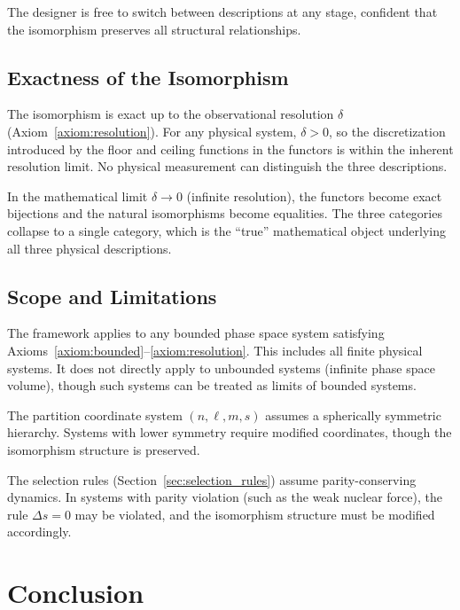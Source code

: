 \documentclass[twocolumn,10pt]{article}
\theoremstyle{remark}
\begin{document}
The designer is free to switch between descriptions at any stage, confident that the isomorphism preserves all structural relationships.

\subsection{Exactness of the Isomorphism}

The isomorphism is exact up to the observational resolution $\delta$ (Axiom~\ref{axiom:resolution}).
For any physical system, $\delta > 0$, so the discretization introduced by the floor and ceiling functions in the functors is within the inherent resolution limit.
No physical measurement can distinguish the three descriptions.

In the mathematical limit $\delta \to 0$ (infinite resolution), the functors become exact bijections and the natural isomorphisms become equalities.
The three categories collapse to a single category, which is the ``true'' mathematical object underlying all three physical descriptions.

\subsection{Scope and Limitations}

The framework applies to any bounded phase space system satisfying Axioms~\ref{axiom:bounded}--\ref{axiom:resolution}.
This includes all finite physical systems.
It does not directly apply to unbounded systems (infinite phase space volume), though such systems can be treated as limits of bounded systems.

The partition coordinate system $(n, \ell, m, s)$ assumes a spherically symmetric hierarchy.
Systems with lower symmetry require modified coordinates, though the isomorphism structure is preserved.

The selection rules (Section~\ref{sec:selection_rules}) assume parity-conserving dynamics.
In systems with parity violation (such as the weak nuclear force), the rule $\Delta s = 0$ may be violated, and the isomorphism structure must be modified accordingly.

\section{Conclusion}
\label{sec:conclusion}
\end{document}
